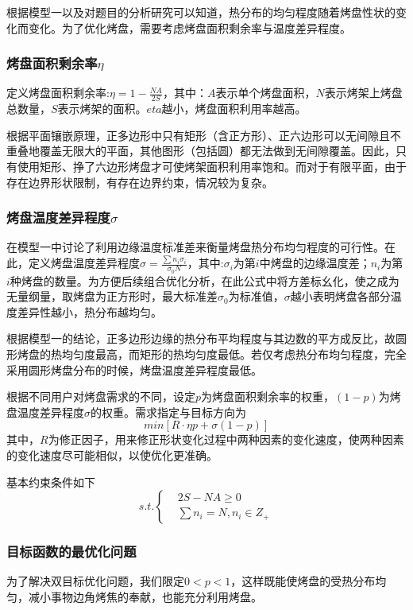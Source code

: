 \documentclass{my_paper}
\begin{document}
根据模型一以及对题目的分析研究可以知道，热分布的均匀程度随着烤盘性状的变化而变化。为了优化烤盘，需要考虑烤盘面积剩余率与温度差异程度。

\subsubsection{烤盘面积剩余率$\eta$}
定义烤盘面积剩余率:$\eta = 1-\frac{NA}{2S}$，其中：$A$表示单个烤盘面积，$N$表示烤架上烤盘总数量，$S$表示烤架的面积。$eta$越小，烤盘面积利用率越高。

根据平面镶嵌原理，正多边形中只有矩形（含正方形）、正六边形可以无间隙且不重叠地覆盖无限大的平面，其他图形（包括圆）都无法做到无间隙覆盖。因此，只有使用矩形、挣了六边形烤盘才可使烤架面积利用率饱和。而对于有限平面，由于存在边界形状限制，有存在边界约束，情况较为复杂。

\subsubsection{烤盘温度差异程度$\sigma$}
在模型一中讨论了利用边缘温度标准差来衡量烤盘热分布均匀程度的可行性。在此，定义烤盘温度差异程度$\sigma=\frac{\sum n_{i} \sigma_{i}}{\sigma_{0}N}$，其中:$\sigma_{i}$为第$i$中烤盘的边缘温度差；$n_{i}$为第$i$种烤盘的数量。为方便后续组合优化分析，在此公式中将方差标幺化，使之成为无量纲量，取烤盘为正方形时，最大标准差$\sigma_{0}$为标准值，$\sigma$越小表明烤盘各部分温度差异性越小，热分布越均匀。

根据模型一的结论，正多边形边缘的热分布平均程度与其边数的平方成反比，故圆形烤盘的热均匀度最高，而矩形的热均匀度最低。若仅考虑热分布均匀程度，完全采用圆形烤盘分布的时候，烤盘温度差异程度最低。

根据不同用户对烤盘需求的不同，设定$p$为烤盘面积剩余率的权重，$(1-p)$为烤盘温度差异程度$\sigma$的权重。需求指定与目标方向为
\begin{equation}
    min[R\cdot \eta p+\sigma(1-p)]
\end{equation}
其中，$R$为修正因子，用来修正形状变化过程中两种因素的变化速度，使两种因素的变化速度尽可能相似，以使优化更准确。

基本约束条件如下
\begin{equation}
    s.t.\left\{
    \begin{aligned}
         & 2S-NA \ge 0                  \\
         & \sum n_{i}=N,n_{i} \in Z_{+}
    \end{aligned}
    \right.
\end{equation}

\subsubsection{目标函数的最优化问题}
为了解决双目标优化问题，我们限定$0<p<1$，这样既能使烤盘的受热分布均匀，减小事物边角烤焦的奉献，也能充分利用烤盘。
\end{document}
